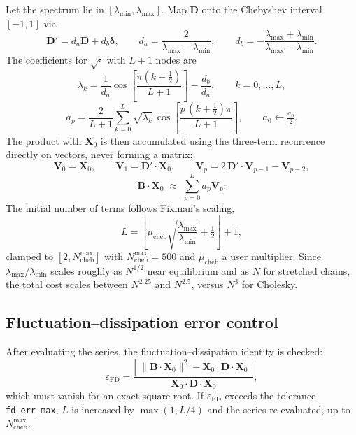 \documentclass[11pt,a4paper]{report}
\newcommand{\D}{\bm{D}}
\newcommand{\B}{\bm{B}}
\newcommand{\code}[1]{\texttt{\seqsplitcode{#1}}}
\newcommand{\seqsplitcode}[1]{#1}
\begin{document}
Let the spectrum lie in $[\lambda_{\min}, \lambda_{\max}]$. Map $\D$ onto the
Chebyshev interval $[-1,1]$ via
\begin{equation}
  \D' = d_a \D + d_b \bm{\delta}, \qquad
  d_a = \frac{2}{\lambda_{\max}-\lambda_{\min}}, \qquad
  d_b = -\frac{\lambda_{\max}+\lambda_{\min}}{\lambda_{\max}-\lambda_{\min}} .
\end{equation}
The coefficients for $\sqrt{\cdot}$ with $L+1$ nodes are
\begin{equation}
  \lambda_k = \frac{1}{d_a}\cos\!\left[\frac{\pi(k+\tfrac12)}{L+1}\right] - \frac{d_b}{d_a},
  \qquad k = 0,\dots,L,
\end{equation}
\begin{equation}
  a_p = \frac{2}{L+1}\sum_{k=0}^{L}\sqrt{\lambda_k}\,
        \cos\!\left[\frac{p\,(k+\tfrac12)\pi}{L+1}\right],
  \qquad a_0 \leftarrow \tfrac{a_0}{2}.
\end{equation}
The product with $\bm{X}_0$ is then accumulated using the three-term recurrence
directly on vectors, never forming a matrix:
\begin{equation}
  \bm{V}_0 = \bm{X}_0, \qquad
  \bm{V}_1 = \D'\cdot\bm{X}_0, \qquad
  \bm{V}_p = 2\,\D'\cdot\bm{V}_{p-1} - \bm{V}_{p-2},
\end{equation}
\begin{equation}
  \B\cdot\bm{X}_0 \;\approx\; \sum_{p=0}^{L} a_p \bm{V}_p .
\end{equation}
The initial number of terms follows Fixman's scaling,
\begin{equation}
  L = \left\lfloor \mu_{\mathrm{cheb}}\sqrt{\frac{\lambda_{\max}}{\lambda_{\min}}} + \tfrac12 \right\rfloor + 1,
  \label{eq:ncheb}
\end{equation}
clamped to $[2, N_{\mathrm{cheb}}^{\max}]$ with $N_{\mathrm{cheb}}^{\max} = 500$
and $\mu_{\mathrm{cheb}}$ a user multiplier. Since
$\lambda_{\max}/\lambda_{\min}$ scales roughly as $N^{1/2}$ near equilibrium and
as $N$ for stretched chains, the total cost scales between $N^{2.25}$ and
$N^{2.5}$, versus $N^{3}$ for Cholesky.

\subsection{Fluctuation--dissipation error control}

After evaluating the series, the fluctuation--dissipation identity is checked:
\begin{equation}
  \varepsilon_{\mathrm{FD}}
    = \frac{\left|\;\|\B\cdot\bm{X}_0\|^{2} - \bm{X}_0\cdot\D\cdot\bm{X}_0\;\right|}
           {\bm{X}_0\cdot\D\cdot\bm{X}_0} ,
  \label{eq:fd}
\end{equation}
which must vanish for an exact square root. If $\varepsilon_{\mathrm{FD}}$
exceeds the tolerance \code{fd\_err\_max}, $L$ is increased by $\max(1, L/4)$ and
the series re-evaluated, up to $N_{\mathrm{cheb}}^{\max}$.
\end{document}
